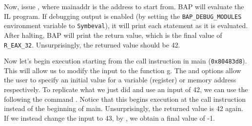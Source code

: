 Now, issue , where
mainaddr is the address to start from.  BAP will evaluate the IL
program.  If debugging output is enabled (by setting the
\texttt{BAP\_DEBUG\_MODULES} environment variable to
\texttt{Symbeval}), it will print each statement as it is evaluated.
After halting, BAP will print the return value, which is the final
value of \texttt{R\_EAX\_32}. Unsurprisingly, the returned value
should be 42.

Now let's begin execution starting from the call instruction in main
(\texttt{0x80483d8}). This will allow us to modify the input to the
function g. The  and  options
allow the user to specify an initial value for a variable (register)
or memory address respectively.  To replicate what we just did and use
an input of 42, we can use the following the command . Notice that this begins execution at the call
instruction instead of the beginning of main.  Unsurprisingly, the
returned value is 42 again.  If we instead change the input to 43, by
, we obtain a final value of -1.

